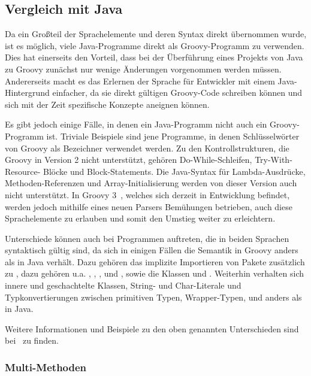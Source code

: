 	\subsection{Vergleich mit Java}\label{subsec:vergleichMitJava}

	Da ein Großteil der Sprachelemente und deren Syntax direkt übernommen wurde, ist es möglich, viele Java-Programme direkt als Groovy-Programm zu verwenden.
	Dies hat einerseits den Vorteil, dass bei der Überführung eines Projekts von Java zu Groovy zunächst nur wenige Änderungen vorgenommen werden müssen.
	Andererseits macht es das Erlernen der Sprache für Entwickler mit einem Java-Hintergrund einfacher, da sie direkt gültigen Groovy-Code schreiben können und sich mit der Zeit spezifische Konzepte aneignen können.

	Es gibt jedoch einige Fälle, in denen ein Java-Programm nicht auch ein Groovy-Programm ist.
	Triviale Beispiele sind jene Programme, in denen Schlüsselwörter von Groovy als Bezeichner verwendet werden.
	Zu den Kontrollstrukturen, die Groovy in Version 2 nicht unterstützt, gehören Do-While-Schleifen, Try-With-Resource- Blöcke und Block-Statements.
	Die Java-Syntax für Lambda-Ausdrücke, Methoden-Referenzen und Array-Initialisierung werden von dieser Version auch nicht unterstützt.
	In Groovy 3~\cite{groovy-lang:release3}, welches sich derzeit in Entwicklung befindet, werden jedoch mithilfe eines neuen Parsers Bemühungen betrieben, auch diese Sprachelemente zu erlauben und somit den Umstieg weiter zu erleichtern.

	Unterschiede können auch bei Programmen auftreten, die in beiden Sprachen syntaktisch gültig sind, da sich in einigen Fällen die Semantik in Groovy anders als in Java verhält.
	Dazu gehören das implizite Importieren von Pakete zusätzlich zu , dazu gehören {u.a.} , , ,  und , sowie die Klassen  und .
	Weiterhin verhalten sich innere und geschachtelte Klassen, String- und Char-Literale und Typkonvertierungen zwischen primitiven Typen, Wrapper-Typen,  und  anders als in Java.

	Weitere Informationen und Beispiele zu den oben genannten Unterschieden sind bei~\cite{groovy-lang:differences} zu finden.

	\subsubsection{Multi-Methoden}

